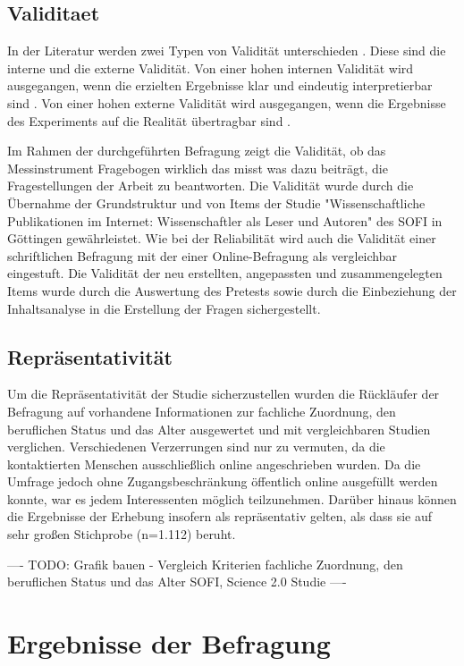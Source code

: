 \subsection{Validitaet}
In der Literatur werden zwei Typen von Validität unterschieden \cite{rost_2004_lehrbuch}. Diese sind die interne und die externe Validität. Von einer hohen internen Validität wird ausgegangen, wenn die erzielten Ergebnisse klar und eindeutig interpretierbar sind \cite{raab_2012_fragebogen}. Von einer hohen externe Validität wird ausgegangen, wenn die Ergebnisse des Experiments auf die Realität übertragbar sind \cite{bortz1995forschungsmethoden}.

Im Rahmen der durchgeführten Befragung zeigt die Validität, ob das Messinstrument Fragebogen wirklich das misst was dazu beiträgt, die Fragestellungen der Arbeit zu beantworten. Die Validität wurde durch die Übernahme der Grundstruktur und von Items der Studie "Wissenschaftliche Publikationen im Internet: Wissenschaftler als Leser und Autoren" des SOFI in Göttingen gewährleistet. Wie bei der Reliabilität wird auch die Validität einer schriftlichen Befragung mit der einer Online-Befragung als vergleichbar eingestuft. Die Validität der neu erstellten, angepassten  und zusammengelegten Items wurde durch die Auswertung des Pretests sowie durch die Einbeziehung der Inhaltsanalyse in die Erstellung der Fragen sichergestellt.

\subsection{Repräsentativität}

Um die Repräsentativität der Studie sicherzustellen wurden die Rückläufer der Befragung auf vorhandene Informationen zur fachliche Zuordnung, den beruflichen Status und das Alter ausgewertet und mit vergleichbaren Studien verglichen. Verschiedenen Verzerrungen sind nur zu vermuten, da die kontaktierten Menschen ausschließlich online angeschrieben wurden. Da die Umfrage jedoch ohne Zugangsbeschränkung öffentlich online ausgefüllt werden konnte, war es jedem Interessenten möglich teilzunehmen. Darüber hinaus können die Ergebnisse der Erhebung insofern als repräsentativ gelten, als dass sie auf sehr großen Stichprobe (n=1.112) beruht.

---- TODO: Grafik bauen - Vergleich Kriterien fachliche Zuordnung, den beruflichen Status und das Alter SOFI, Science 2.0 Studie ----

\section{Ergebnisse der Befragung}

